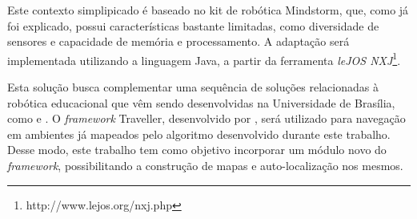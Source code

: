 Este contexto simplipicado é baseado no kit de robótica Mindstorm, que, como já foi explicado, possui características bastante limitadas, como diversidade de sensores e capacidade de memória e processamento. A adaptação será implementada utilizando a linguagem Java, a partir da ferramenta \textit{leJOS NXJ}\footnote{http://www.lejos.org/nxj.php}.

Esta solução busca complementar uma sequência de soluções relacionadas à robótica educacional que vêm sendo desenvolvidas na Universidade de Brasília, como \cite{tccCarol} e \cite{tccRodrigo}. O \textit{framework} Traveller, desenvolvido por \cite{tccRodrigo}, será utilizado para navegação em ambientes já mapeados pelo algoritmo desenvolvido durante este trabalho. Desse modo, este trabalho tem como objetivo incorporar um módulo novo do \textit{framework}, possibilitando a construção de mapas e auto-localização nos mesmos.


